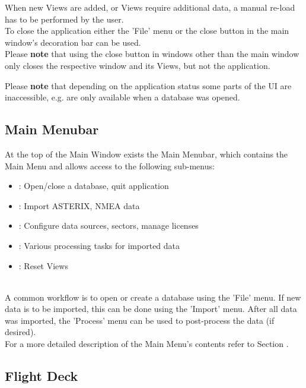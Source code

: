 When new Views are added, or Views require additional data, a manual re-load has to be performed by the user. \\

To close the application either the 'File' menu or the close button in the main window's decoration bar can be used. \\

Please \textbf{note} that using the close button in windows other than the main window only closes the respective window and its Views, but not the application.

Please \textbf{note} that depending on the application status some parts of the UI are inaccessible, e.g. are only available when a database was opened.

\subsection{Main Menubar}
\label{sec:ui_main_menu_bar}

At the top of the Main Window exists the Main Menubar, which contains the Main Menu and allows access to the following sub-menus: 

\begin{itemize}
 \item {}: Open/close a database, quit application
 \item {}: Import ASTERIX, NMEA data
 \item {}: Configure data sources, sectors, manage licenses
 \item {}: Various processing tasks for imported data
 \item {}: Reset Views
\end{itemize} 
\  \\

A common workflow is to open or create a database using the 'File' menu. If new data is to be imported, this can be done using the 'Import' menu. 
After all data was imported, the 'Process' menu can be used to post-process the data (if desired). \\

For a more detailed description of the Main Menu's contents refer to Section .

\subsection{Flight Deck} 
\label{sec:ui_flight_deck}

